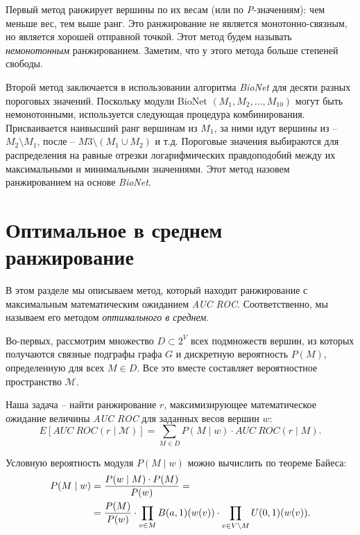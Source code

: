 Первый метод ранжирует вершины по их весам (или по \emph{P}-значениям): чем
меньше вес, тем выше ранг.  Это ранжирование не является монотонно-связным, но
является хорошей отправной точкой.  Этот метод будем называть
\emph{немонотонным} ранжированием.  Заметим, что у этого метода больше степеней
свободы.

Второй метод заключается в использовании алгоритма \emph{BioNet} для десяти
разных пороговых значений.  Поскольку модули BioNet $(M_1, M_2, \ldots,
M_{10})$ могут быть немонотонными, используется следующая процедура
комбинирования.  Присваивается наивысший ранг вершинам из $M_1$, за ними идут
вершины из -- $M_2 \setminus M_1$, после -- $M3 \setminus (M_1 \cup M_2)$
и т.д. Пороговые значения выбираются для распределения на равные отрезки
логарифмических правдоподобий между их максимальными и минимальными значениями.
Этот метод назовем ранжированием на основе \emph{BioNet}.





\section{Оптимальное в среднем ранжирование}
\label{sec_optimal}

В этом разделе мы описываем метод, который находит ранжирование с максимальным
математическим ожиданием \emph{AUC ROC}. Соответственно, мы называем его
методом \emph{оптимального в среднем}.

Во-первых, рассмотрим множество $D \subset 2^V$ всех подмножеств вершин, из
которых получаются связные подграфы графа $G$ и дискретную вероятность $P(M)$,
определенную для всех $M \in D$. Все это вместе составляет вероятностное
пространство $\mathcal{M}$.

Наша задача -- найти ранжирование $r$, максимизирующее математическое ожидание
величины \emph{AUC ROC} для заданных весов вершин $w$:
\begin{equation} \label{formula:eauc} 
    E[AUC~ROC(r \mid \mathcal{M})] = \sum_{M \in D} P(M \mid w) \cdot AUC~ROC(r
    \mid M).
\end{equation}

Условную вероятность модуля $P(M \mid w)$ можно вычислить по теореме Байеса:
\begin{align}
    P(M \mid w) &= \frac{P(w \mid M) \cdot P(M)}{P(w)} = \notag \\
    &= \frac{P(M)}{P(w)} \cdot \prod_{v \in M} B(a,1)(w(v)) \cdot \prod_{v
    \in {V \setminus M}} U(0,1)(w(v)).
\end{align}

